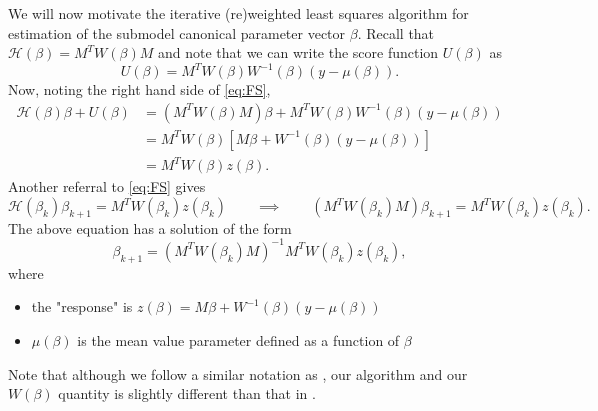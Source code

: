 \documentclass[12pt]{article}
\newcommand{\Hcal}{\mathcal{H}}
\begin{document}
We will now motivate the iterative (re)weighted least squares algorithm for estimation of the submodel canonical parameter vector $\beta$. Recall that $\Hcal(\beta) = M^TW(\beta)M$ and note that we can write the score function $U(\beta)$ as 
$$
  U(\beta) = M^T W(\beta) W^{-1}(\beta)(y - \mu(\beta)). 
$$
Now, noting the right hand side of \eqref{eq:FS},
\begin{align*}
	\Hcal(\beta)\beta + U(\beta) &= (M^TW(\beta)M)\beta + M^TW(\beta) W^{-1}(\beta)(y - \mu(\beta)) \\
	&= M^T W(\beta)\left[M\beta + W^{-1}(\beta)(y - \mu(\beta))\right] \\
	&= M^T W(\beta) z(\beta).
\end{align*}
Another referral to \eqref{eq:FS} gives
$$
  \Hcal(\beta_k)\beta_{k+1} = M^T W(\beta_k) z(\beta_k) 
  \qquad \implies \qquad 
  (M^TW(\beta_k)M)\beta_{k+1} = M^T W(\beta_k) z(\beta_k).
$$
The above equation has a solution of the form
$$
  \beta_{k+1} = (M^TW(\beta_k)M)^{-1}M^T W(\beta_k) z(\beta_k), 
$$
where 
\begin{itemize}
	\item the "response" is $z(\beta) = M\beta + W^{-1}(\beta)(y - \mu(\beta))$
	\item $\mu(\beta)$ is the mean value parameter defined as a function of $\beta$
\end{itemize}
Note that although we follow a similar notation as \cite{agresti2013cat}, our algorithm and our $W(\beta)$ quantity is slightly different than that in \cite{agresti2013cat}.


\end{document}
